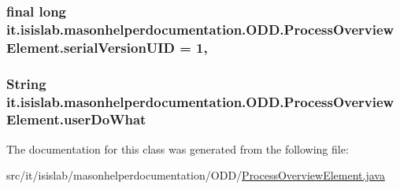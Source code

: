 \hypertarget{classit_1_1isislab_1_1masonhelperdocumentation_1_1_o_d_d_1_1_process_overview_element_a45b2a88aa02008be6bb02926600ac8bd}{
\subsubsection[{serial\-Version\-U\-I\-D}]{\setlength{\rightskip}{0pt plus 5cm}final long it.\-isislab.\-masonhelperdocumentation.\-O\-D\-D.\-Process\-Overview\-Element.\-serial\-Version\-U\-I\-D = 1\hspace{0.3cm}{\ttfamily [static]}, {\ttfamily [private]}}}\label{classit_1_1isislab_1_1masonhelperdocumentation_1_1_o_d_d_1_1_process_overview_element_a45b2a88aa02008be6bb02926600ac8bd}
\hypertarget{classit_1_1isislab_1_1masonhelperdocumentation_1_1_o_d_d_1_1_process_overview_element_adf547a3ee1fe686d4e7cb2a446761a52}{
\subsubsection[{user\-Do\-What}]{\setlength{\rightskip}{0pt plus 5cm}String it.\-isislab.\-masonhelperdocumentation.\-O\-D\-D.\-Process\-Overview\-Element.\-user\-Do\-What\hspace{0.3cm}{\ttfamily [package]}}}\label{classit_1_1isislab_1_1masonhelperdocumentation_1_1_o_d_d_1_1_process_overview_element_adf547a3ee1fe686d4e7cb2a446761a52}


The documentation for this class was generated from the following file\-:\begin{DoxyCompactItemize}
\item 
src/it/isislab/masonhelperdocumentation/\-O\-D\-D/\hyperlink{_process_overview_element_8java}{Process\-Overview\-Element.\-java}\end{DoxyCompactItemize}
